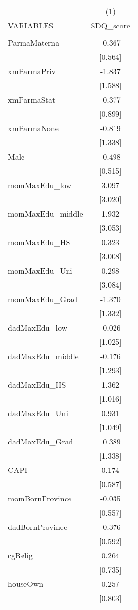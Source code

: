 \documentclass[]{article}
\begin{document}
\begin{tabular}{lc} \hline
 & (1) \\
VARIABLES & SDQ\_score \\ \hline
 &  \\
ParmaMaterna & -0.367 \\
 & [0.564] \\
xmParmaPriv & -1.837 \\
 & [1.588] \\
xmParmaStat & -0.377 \\
 & [0.899] \\
xmParmaNone & -0.819 \\
 & [1.338] \\
Male & -0.498 \\
 & [0.515] \\
momMaxEdu\_low & 3.097 \\
 & [3.020] \\
momMaxEdu\_middle & 1.932 \\
 & [3.053] \\
momMaxEdu\_HS & 0.323 \\
 & [3.008] \\
momMaxEdu\_Uni & 0.298 \\
 & [3.084] \\
momMaxEdu\_Grad & -1.370 \\
 & [1.332] \\
dadMaxEdu\_low & -0.026 \\
 & [1.025] \\
dadMaxEdu\_middle & -0.176 \\
 & [1.293] \\
dadMaxEdu\_HS & 1.362 \\
 & [1.016] \\
dadMaxEdu\_Uni & 0.931 \\
 & [1.049] \\
dadMaxEdu\_Grad & -0.389 \\
 & [1.338] \\
CAPI & 0.174 \\
 & [0.587] \\
momBornProvince & -0.035 \\
 & [0.557] \\
dadBornProvince & -0.376 \\
 & [0.592] \\
cgRelig & 0.264 \\
 & [0.735] \\
houseOwn & 0.257 \\
 & [0.803] \\

\end{tabular}
\end{document}
